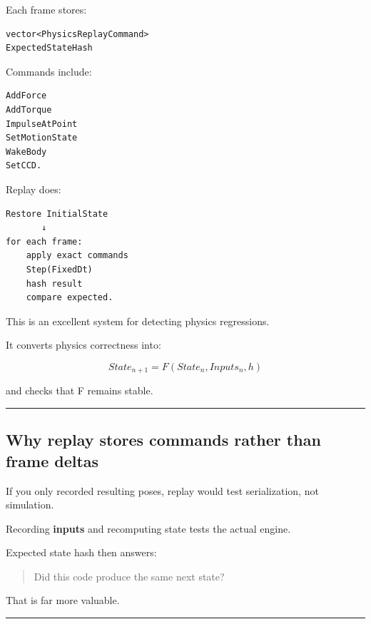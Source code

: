 Each frame stores:

\begin{verbatim}
vector<PhysicsReplayCommand>
ExpectedStateHash
\end{verbatim}

Commands include:

\begin{verbatim}
AddForce
AddTorque
ImpulseAtPoint
SetMotionState
WakeBody
SetCCD.
\end{verbatim}

Replay does:

\begin{verbatim}
Restore InitialState
       ↓
for each frame:
    apply exact commands
    Step(FixedDt)
    hash result
    compare expected.
\end{verbatim}

This is an excellent system for detecting physics regressions.

It converts physics correctness into:

\[
\boxed{
State_{n+1}
=
F(State_n,Inputs_n,h)
}
\]

and checks that F remains stable.

\begin{center}\rule{0.5\linewidth}{0.5pt}\end{center}

\subsection{Why replay stores commands rather than frame deltas}\label{06-engine-ii-ch038-why-replay-stores-commands-rather-than-frame-deltas}

\hypertarget{06-engine-ii-ch038-why-replay-stores-commands-rather-than-frame-deltas}{}

If you only recorded resulting poses, replay would test serialization, not simulation.

Recording \textbf{inputs} and recomputing state tests the actual engine.

Expected state hash then answers:

\begin{quote}
Did this code produce the same next state?
\end{quote}

That is far more valuable.

\begin{center}\rule{0.5\linewidth}{0.5pt}\end{center}

